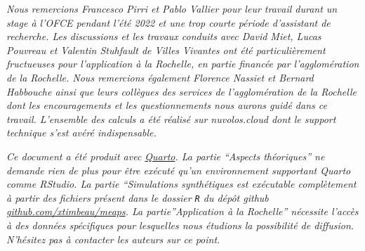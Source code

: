 \documentclass[
  10pt,
  a4paper,
  numbers=noendperiod,
  DIV=9]{scrreprt}
\begin{document}
\begin{tcolorbox}[enhanced jigsaw, leftrule=.75mm, opacitybacktitle=0.6, bottomtitle=1mm, bottomrule=.15mm, coltitle=black, title=\textcolor{quarto-callout-note-color}{\faInfo}\hspace{0.5em}{\emph{Remerciements}}, colback=white, colframe=quarto-callout-note-color-frame, opacityback=0, titlerule=0mm, left=2mm, colbacktitle=quarto-callout-note-color!10!white, arc=.35mm, toptitle=1mm, rightrule=.15mm, toprule=.15mm, breakable]

\emph{Nous remercions Francesco Pirri et Pablo Vallier pour leur travail
durant un stage à l'OFCE pendant l'été 2022 et une trop courte période
d'assistant de recherche. Les discussions et les travaux conduits avec
David Miet, Lucas Pouvreau et Valentin Stuhfault de Villes Vivantes ont
été particulièrement fructueuses pour l'application à la Rochelle, en
partie financée par l'agglomération de la Rochelle. Nous remercions
également Florence Nassiet et Bernard Habbouche ainsi que leurs
collègues des services de l'agglomération de la Rochelle dont les
encouragements et les questionnements nous aurons guidé dans ce travail.
L'ensemble des calculs a été réalisé sur nuvolos.cloud dont le support
technique s'est avéré indispensable.}

\end{tcolorbox}

\begin{tcolorbox}[enhanced jigsaw, leftrule=.75mm, opacitybacktitle=0.6, bottomtitle=1mm, bottomrule=.15mm, coltitle=black, title=\textcolor{quarto-callout-tip-color}{\faLightbulb}\hspace{0.5em}{Quarto}, colback=white, colframe=quarto-callout-tip-color-frame, opacityback=0, titlerule=0mm, left=2mm, colbacktitle=quarto-callout-tip-color!10!white, arc=.35mm, toptitle=1mm, rightrule=.15mm, toprule=.15mm, breakable]

\emph{Ce document a été produit avec \href{https://quarto.org}{Quarto}.
La partie ``Aspects théoriques'' ne demande rien de plus pour être
exécuté qu'un environnement supportant Quarto comme RStudio. La partie
``Simulations synthétiques est exécutable complètement à partir des
fichiers présent dans le dossier \texttt{R} du dépôt github
\href{https://github.com/xtimbeau/meaps}{github.com/xtimbeau/meaps}. La
partie''Application à la Rochelle'' nécessite l'accès à des données
spécifiques pour lesquelles nous étudions la possibilité de diffusion.
N'hésitez pas à contacter les auteurs sur ce point.}

\end{tcolorbox}
\end{document}
